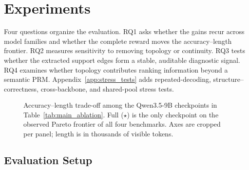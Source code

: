 \section{Experiments}
\label{sec:experiments}

Four questions organize the evaluation. RQ1 asks whether the gains recur across model families and whether the complete reward moves the accuracy--length frontier. RQ2 measures sensitivity to removing topology or continuity. RQ3 tests whether the extracted support edges form a stable, auditable diagnostic signal. RQ4 examines whether topology contributes ranking information beyond a semantic PRM. Appendix~\ref{app:stress_tests} adds repeated-decoding, structure--correctness, cross-backbone, and shared-pool stress tests. 



\begin{figure}[!t]
\centering

\caption{Accuracy--length trade-off among the Qwen3.5-9B checkpoints in Table~\ref{tab:main_ablation}. Full ($\star$) is the only checkpoint on the observed Pareto frontier of all four benchmarks. Axes are cropped per panel; length is in thousands of visible tokens.}
\label{fig:pareto_frontier}
\end{figure}
\FloatBarrier

\subsection{Evaluation Setup}
\label{sec:setup}

